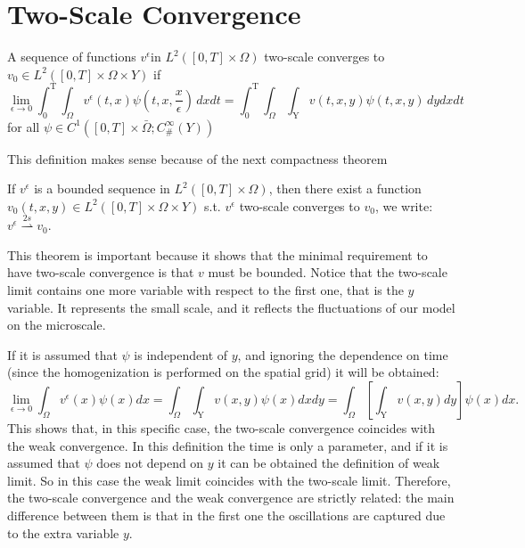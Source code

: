 \section{Two-Scale Convergence}

\begin{definition}
A sequence of functions $ v ^ {\epsilon } $in $ L^2([ 0 ,T]\times\Omega) $ two-scale converges to $v_{0} \in L^2([ 0 ,T]\times\Omega \times Y)$ if
$$
\lim_{\epsilon \to 0} \int_{0}^{\textrm{T}} \int_{\Omega} v^{\epsilon}(t,x)\psi\left(t,x,\frac{x}{\epsilon}\right) \, dxdt=\int_{0}^{\textrm{T}} \int_{\Omega} \int_{\textrm{Y}} v(t,x,y)\psi(t,x,y) \, dydxdt
$$ 
for all $\psi \in C^1([0,T]\times \bar\Omega;C_{\#}^{\infty}(Y))$
\label{def 7.1}\end{definition}
This definition makes sense because of the next compactness theorem 
\begin{theorem}
If $v^{\epsilon}$ is a bounded sequence in $ L^2([ 0 ,T]\times\Omega) $, then there exist a function $v_{0}(t,x,y) \in   L^2([0,T]\times\Omega \times Y)$ s.t. $v^{\epsilon}$ two-scale converges to $v_{0}$, we write: 
$v^{\epsilon} \overset{2s}{\rightharpoonup} v_{0}$.
\label{thm 7.1}\end{theorem}
This theorem is important because it shows that the minimal requirement to have two-scale convergence is that $v$ must be bounded. Notice that the two-scale limit contains one more variable with respect to the first one, that is the $y$ variable. It represents the small scale, and it reflects the fluctuations of our model on the microscale.
\begin{remark} If it is assumed that $\psi$ is independent of $y$, and ignoring the dependence on time (since the homogenization is performed on the spatial grid) it will be obtained:
$$ 
\lim_{\epsilon \to 0} \int_{\Omega} v^{\epsilon}(x)\psi(x)dx= \int_{\Omega} \int_{\textrm{Y}} v(x,y)\psi(x)dxdy=\int_{\Omega} \left[\int_{\textrm{Y}} v(x,y)dy\right]\psi(x)dx.
$$This shows that, in this specific case, the two-scale convergence coincides with the weak convergence.
In this definition the time is only a parameter, and if it is assumed that $\psi$ does not depend on $y$ it can be obtained the definition of weak limit. So in this case the weak limit coincides with the two-scale limit. Therefore, the two-scale convergence and the weak convergence are strictly related: the main difference between them is that in the first one the oscillations are captured due to the extra variable $y$.
\end{remark}

